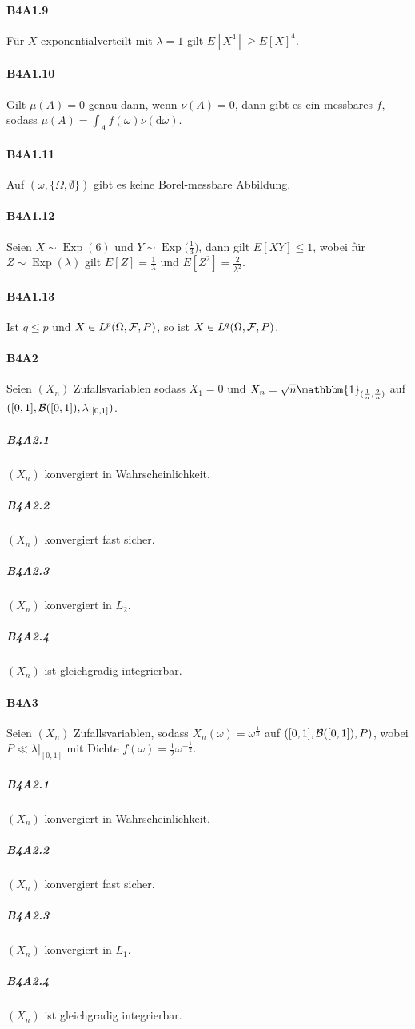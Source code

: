 \documentclass{article}
\begin{document}
\paragraph{B4A1.9}
Für $X$ exponentialverteilt mit $\lambda=1$ gilt $E[X^4]\geq E[X]^4$.
\paragraph{B4A1.10}
Gilt $\mu(A)=0$ genau dann, wenn $\nu(A)=0$, dann gibt es ein messbares $f$, sodass $\mu(A)=\int_A f(\omega)\nu(\mathrm{d}\omega)$.
\paragraph{B4A1.11}
Auf $(\omega,\{\Omega,\emptyset\})$ gibt es keine Borel-messbare Abbildung.
\paragraph{B4A1.12}
Seien $X\sim\operatorname{Exp}(6)$ und $Y\sim\operatorname{Exp}\bigl(\frac{1}{3}\bigr)$, dann gilt $E[XY]\leq1$, wobei für $Z\sim\operatorname{Exp}(\lambda)$ gilt $E[Z]=\frac{1}{\lambda}$ und $E[Z^2]=\frac{2}{\lambda^2}$.
\paragraph{B4A1.13}
Ist $q\leq p$ und $X\in L^p(\Omega,{\cal F},P)$, so ist $X\in L^q(\Omega,{\cal F},P)$.
\newpage

\paragraph{B4A2}
Seien $(X_n)$ Zufallsvariablen sodass $X_1=0$ und $X_n=\sqrt{n}\mathbbm{1}_{(\frac{1}{n},\frac{2}{n})}$ auf $([0,1],{\cal B}([0,1]),\lambda|_{[0,1]})$.
\subparagraph{B4A2.1} $(X_n)$ konvergiert in Wahrscheinlichkeit.

\subparagraph{B4A2.2} $(X_n)$ konvergiert fast sicher.

\subparagraph{B4A2.3} $(X_n)$ konvergiert in $L_2$.

\subparagraph{B4A2.4} $(X_n)$ ist gleichgradig integrierbar.
\newpage

\paragraph{B4A3} Seien $(X_n)$ Zufallsvariablen, sodass $X_n(\omega)=\omega^{\frac{1}{n}}$ auf $([0,1],{\cal B}([0,1]),P)$, wobei $P\ll\lambda|_{[0,1]}$ mit Dichte $f(\omega)=\frac{1}{2}\omega^{-\frac{1}{2}}$.
\subparagraph{B4A2.1} $(X_n)$ konvergiert in Wahrscheinlichkeit.

\subparagraph{B4A2.2} $(X_n)$ konvergiert fast sicher.

\subparagraph{B4A2.3} $(X_n)$ konvergiert in $L_1$.

\subparagraph{B4A2.4} $(X_n)$ ist gleichgradig integrierbar.
\newpage


\end{document}
